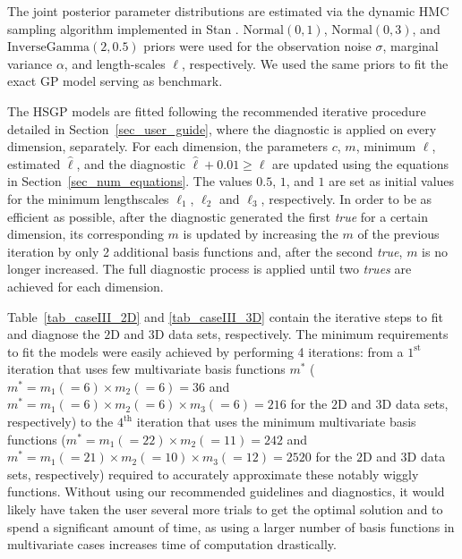 The joint posterior parameter distributions are estimated via the dynamic HMC sampling algorithm implemented in Stan \citep{StanTeam:2021}. $\mathrm{Normal}(0,1)$, $\mathrm{Normal}(0,3)$, and $\mathrm{InverseGamma}(2,0.5)$ priors were used for the observation noise $\sigma$, marginal variance $\alpha$, and length-scales $\ell$, respectively. We used the same priors to fit the exact GP model serving as benchmark.

The HSGP models are fitted following the recommended iterative procedure detailed in Section~\ref{sec_user_guide}, where the diagnostic is applied on every dimension, separately. For each dimension, the parameters $c$, $m$, minimum $\ell$, estimated $\hat{\ell}$, and the diagnostic $\hat{\ell} + 0.01 \geq \ell$ are updated using the equations in Section~\ref{sec_num_equations}. The values $0.5$, $1$, and $1$ are set as initial values for the minimum lengthscales $\ell_1$, $\ell_2$ and $\ell_3$, respectively. In order to be as efficient as possible, after the diagnostic generated the first \textit{true} for a certain dimension, its corresponding $m$ is updated by increasing the $m$ of the previous iteration by only 2 additional basis functions and, after the second \textit{true}, $m$ is no longer increased. The full diagnostic process is applied until two \textit{trues} are achieved for each dimension. 

Table~\ref{tab_caseIII_2D} and \ref{tab_caseIII_3D} contain the iterative steps to fit and diagnose the $2$D and $3$D data sets, respectively. 
The minimum requirements to fit the models were easily achieved by performing 4 iterations: from a $1^{\text{st}}$ iteration that uses few multivariate basis functions $m^*$ ($m^*=m_1(=6) \times m_2(=6)=36$ and $m^*=m_1(=6) \times m_2(=6) \times m_3(=6)=216$ for the $2$D and $3$D data sets, respectively) to the $4^{\text{th}}$ iteration that uses the minimum multivariate basis functions ($m^*=m_1(=22) \times m_2(=11)=242$ and $m^*=m_1(=21) \times m_2(=10) \times m_3(=12)=2520$ for the $2$D and $3$D data sets, respectively) required to accurately approximate these notably wiggly functions. Without using our recommended guidelines and diagnostics, it would likely have taken the user several more trials to get the optimal solution and to spend a significant amount of time, as using a larger number of basis functions in multivariate cases increases time of computation drastically.

